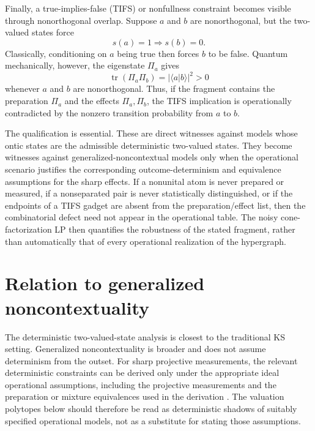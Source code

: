 \documentclass[aps,pra,twocolumn,superscriptaddress,nofootinbib]{revtex4-2}
\newcommand{\tr}{\operatorname{tr}}
\begin{document}
Finally, a true-implies-false (TIFS) or nonfullness constraint becomes visible
through nonorthogonal overlap.  Suppose $a$ and $b$ are nonorthogonal, but
the two-valued states force
\begin{equation}
        s(a)=1\Longrightarrow s(b)=0.
\end{equation}
Classically, conditioning on $a$ being true then forces $b$ to be false.
Quantum mechanically, however, the eigenstate $\Pi_a$ gives
\begin{equation}
        \tr(\Pi_a\Pi_b)=|\langle a|b\rangle|^2>0
\end{equation}
whenever $a$ and $b$ are nonorthogonal.  Thus, if the fragment contains the
preparation $\Pi_a$ and the effects $\Pi_a,\Pi_b$, the TIFS implication is
operationally contradicted by the nonzero transition probability from $a$ to
$b$.

The qualification is essential.  These are direct witnesses against models
whose ontic states are the admissible deterministic two-valued states.  They
become witnesses against generalized-noncontextual models only when the
operational scenario justifies the corresponding outcome-determinism and
equivalence assumptions for the sharp effects.  If a nonunital atom is never
prepared or measured, if a nonseparated pair is never statistically
distinguished, or if the endpoints of a TIFS gadget are absent from the
preparation/effect list, then the combinatorial defect need not appear in the
operational table.  The noisy cone-factorization LP then quantifies the
robustness of the stated fragment, rather than automatically that of every
operational realization of the hypergraph.

\section{Relation to generalized noncontextuality}

The deterministic two-valued-state analysis is closest to the traditional KS
setting.  Generalized noncontextuality is broader and does not assume
determinism from the outset.  For sharp projective measurements, the relevant
deterministic constraints can be derived only under the appropriate ideal
operational assumptions, including the projective measurements and the
preparation or mixture equivalences used in the derivation
\cite{kunjwal-spekkens-2015}.  The valuation polytopes below should therefore
be read as deterministic shadows of suitably specified operational models, not
as a substitute for stating those assumptions.
\end{document}

